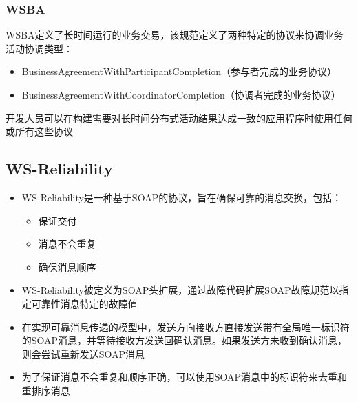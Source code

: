 \subsubsection{WSBA}
WSBA定义了长时间运行的业务交易，该规范定义了两种特定的协议来协调业务活动协调类型：
\begin{itemize}
    \item BusinessAgreementWithParticipantCompletion（参与者完成的业务协议）
    \item BusinessAgreementWithCoordinatorCompletion（协调者完成的业务协议）
\end{itemize}

开发人员可以在构建需要对长时间分布式活动结果达成一致的应用程序时使用任何或所有这些协议

\subsection{WS-Reliability}
\begin{itemize}
    \item WS-Reliability是一种基于SOAP的协议，旨在确保可靠的消息交换，包括：
    \vspace{-0.8em}
    \begin{multicols}{3}
        \begin{itemize}
            \item 保证交付
            \item 消息不会重复
            \item 确保消息顺序
        \end{itemize}
    \end{multicols}
    \vspace{-1em}
    \item WS-Reliability被定义为SOAP头扩展，通过故障代码扩展SOAP故障规范以指定可靠性消息特定的故障值
    \item 在实现可靠消息传递的模型中，发送方向接收方直接发送带有全局唯一标识符的SOAP消息，并等待接收方发送回确认消息。如果发送方未收到确认消息，则会尝试重新发送SOAP消息
    \item 为了保证消息不会重复和顺序正确，可以使用SOAP消息中的标识符来去重和重排序消息
\end{itemize}

